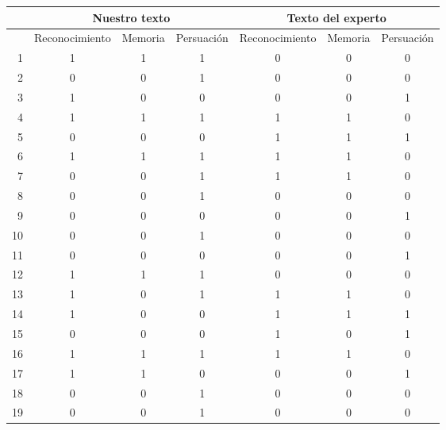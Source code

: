 \begin{table}
\centering
\tiny
\begin{tabular}{|r|c|c|c|c|c|c|}
   & \multicolumn{3}{c|}{Nuestro texto}     & \multicolumn{3}{c|}{Texto del experto}   \\\hline
   & Reconocimiento & Memoria & Persuación & Reconocimiento & Memoria & Persuación \\\hline \hline

1 &         1 &         1 &         1 &         0 &         0 &         0 \\
2 &         0 &         0 &         1 &         0 &         0 &         0 \\
3 &         1 &         0 &         0 &         0 &         0 &         1 \\
4 &         1 &         1 &         1 &         1 &         1 &         0 \\
5 &         0 &         0 &         0 &         1 &         1 &         1 \\
6 &         1 &         1 &         1 &         1 &         1 &         0 \\
7 &         0 &         0 &         1 &         1 &         1 &         0 \\
8 &         0 &         0 &         1 &         0 &         0 &         0 \\
9 &         0 &         0 &         0 &         0 &         0 &         1 \\
10 &         0 &         0 &         1 &         0 &         0 &         0 \\
11 &         0 &         0 &         0 &         0 &         0 &         1 \\
12 &         1 &         1 &         1 &         0 &         0 &         0 \\
13 &         1 &         0 &         1 &         1 &         1 &         0 \\
14 &         1 &         0 &         0 &         1 &         1 &         1 \\
15 &         0 &         0 &         0 &         1 &         0 &         1 \\
16 &         1 &         1 &         1 &         1 &         1 &         0 \\
17 &         1 &         1 &         0 &         0 &         0 &         1 \\
18 &         0 &         0 &         1 &         0 &         0 &         0 \\
19 &         0 &         0 &         1 &         0 &         0 &         0 \\

\end{tabular}
\end{table}
